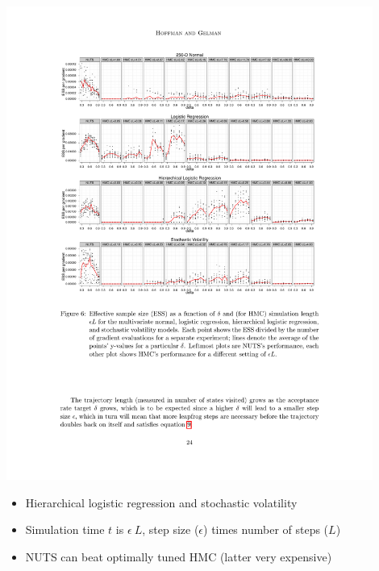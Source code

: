 \documentclass[10pt]{report}
\begin{document}
\includegraphics[width=0.9\textwidth]{img/nuts-ess-2.pdf}

{\small
  \begin{itemize}
  \item Hierarchical logistic regression and stochastic volatility
  \item Simulation time $t$ is $\epsilon \ L$, step size ($\epsilon$)
    times number of steps ($L$)
  \item NUTS can beat optimally tuned HMC (latter very expensive)
  \end{itemize}
}




\end{document}

